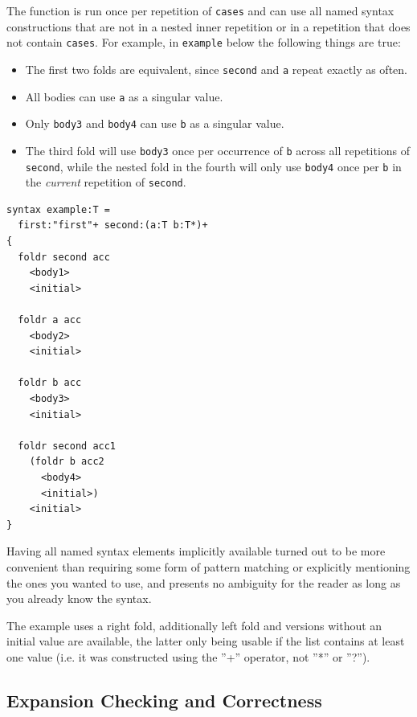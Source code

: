 \documentclass{kththesis}
\begin{document}
The function is run once per repetition of \texttt{cases} and can use all named syntax constructions that are not in a nested inner repetition or in a repetition that does not contain \texttt{cases}. For example, in \texttt{example} below the following things are true:
\begin{itemize}
  \item The first two folds are equivalent, since \texttt{second} and \texttt{a} repeat exactly as often.
  \item All bodies can use \texttt{a} as a singular value.
  \item Only \texttt{body3} and \texttt{body4} can use \texttt{b} as a singular value.
  \item The third fold will use \texttt{body3} once per occurrence of \texttt{b} across all repetitions of \texttt{second}, while the nested fold in the fourth will only use \texttt{body4} once per \texttt{b} in the \emph{current} repetition of \texttt{second}.
\end{itemize}

\begin{verbatim}
syntax example:T =
  first:"first"+ second:(a:T b:T*)+
{
  foldr second acc
    <body1>
    <initial>

  foldr a acc
    <body2>
    <initial>

  foldr b acc
    <body3>
    <initial>

  foldr second acc1
    (foldr b acc2
      <body4>
      <initial>)
    <initial>
}
\end{verbatim}

Having all named syntax elements implicitly available turned out to be more convenient than requiring some form of pattern matching or explicitly mentioning the ones you wanted to use, and presents no ambiguity for the reader as long as you already know the syntax.

The example uses a right fold, additionally left fold and versions without an initial value are available, the latter only being usable if the list contains at least one value (i.e. it was constructed using the ''+'' operator, not ''*'' or ''?'').

\subsection{Expansion Checking and Correctness} \label{sec:expansion-checking}
\end{document}
